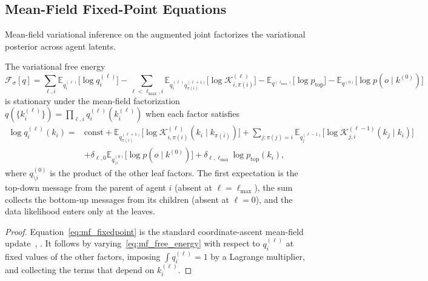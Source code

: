 \subsection{Mean-Field Fixed-Point Equations}

Mean-field variational inference on the augmented joint factorizes the variational posterior across agent latents.

\begin{lemma}
\label{lem:mf_fixedpoint}
The variational free energy
\begin{equation}
\mathcal{F}_{\sigma}[q]
=
\sum_{\ell, i} \mathbb{E}_{q_i^{(\ell)}}\big[\log q_i^{(\ell)}\big]
- \sum_{\ell < \ell_{\max}, i} \mathbb{E}_{q_i^{(\ell)} q_{\pi(i)}^{(\ell+1)}}\big[\log \mathcal{K}_{i,\pi(i)}^{(\ell)}\big]
- \mathbb{E}_{q^{(\ell_{\max})}}\big[\log p_{\mathrm{top}}\big]
- \mathbb{E}_{q^{(0)}}\big[\log p(o \mid k^{(0)})\big]
\label{eq:mf_free_energy}
\end{equation}
is stationary under the mean-field factorization $q(\{k_i^{(\ell)}\}) = \prod_{\ell, i} q_i^{(\ell)}(k_i^{(\ell)})$ when each factor satisfies
\begin{equation}
\begin{aligned}
\log q_i^{(\ell)}(k_i)
={}&
\text{const}
+ \mathbb{E}_{q_{\pi(i)}^{(\ell+1)}}\big[\log \mathcal{K}_{i,\pi(i)}^{(\ell)}(k_i \mid k_{\pi(i)})\big]
+ \sum_{j : \pi(j) = i} \mathbb{E}_{q_j^{(\ell-1)}}\big[\log \mathcal{K}_{j,i}^{(\ell-1)}(k_j \mid k_i)\big]\\
&+ \delta_{\ell,0} \mathbb{E}_{q^{(0)}_{\setminus i}}\big[\log p(o \mid k^{(0)})\big]
+ \delta_{\ell,\ell_{\max}} \log p_{\mathrm{top}}(k_i),
\end{aligned}
\label{eq:mf_fixedpoint}
\end{equation}
where $q^{(0)}_{\setminus i}$ is the product of the other leaf factors. The first expectation is the top-down message from the parent of agent $i$ (absent at $\ell = \ell_{\max}$), the sum collects the bottom-up messages from its children (absent at $\ell = 0$), and the data likelihood enters only at the leaves.
\end{lemma}

\begin{proof}
Equation~\eqref{eq:mf_fixedpoint} is the standard coordinate-ascent mean-field update~\cite[\S5.3]{Wainwright2008}, \cite[\S10.1]{Bishop2006}. It follows by varying~\eqref{eq:mf_free_energy} with respect to $q_i^{(\ell)}$ at fixed values of the other factors, imposing $\int q_i^{(\ell)} = 1$ by a Lagrange multiplier, and collecting the terms that depend on $k_i^{(\ell)}$.
\end{proof}

